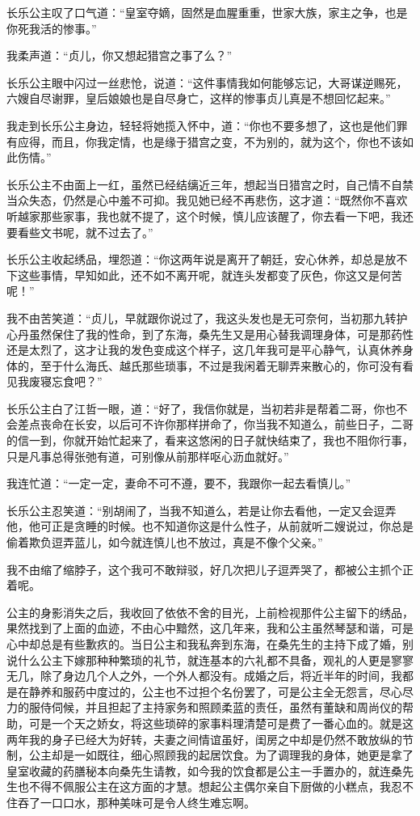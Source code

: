 长乐公主叹了口气道：“皇室夺嫡，固然是血腥重重，世家大族，家主之争，也是你死我活的惨事。”

我柔声道：“贞儿，你又想起猎宫之事了么？”

长乐公主眼中闪过一丝悲怆，说道：“这件事情我如何能够忘记，大哥谋逆赐死，六嫂自尽谢罪，皇后娘娘也是自尽身亡，这样的惨事贞儿真是不想回忆起来。”

我走到长乐公主身边，轻轻将她揽入怀中，道：“你也不要多想了，这也是他们罪有应得，而且，你我定情，也是缘于猎宫之变，不为别的，就为这个，你也不该如此伤情。”

长乐公主不由面上一红，虽然已经结缡近三年，想起当日猎宫之时，自己情不自禁当众失态，仍然是心中羞不可抑。我见她已经不再悲伤，这才道：“既然你不喜欢听越家那些家事，我也就不提了，这个时候，慎儿应该醒了，你去看一下吧，我还要看些文书呢，就不过去了。”

长乐公主收起绣品，埋怨道：“你这两年说是离开了朝廷，安心休养，却总是放不下这些事情，早知如此，还不如不离开呢，就连头发都变了灰色，你这又是何苦呢！”

我不由苦笑道：“贞儿，早就跟你说过了，我这头发也是无可奈何，当初那九转护心丹虽然保住了我的性命，到了东海，桑先生又是用心替我调理身体，可是那药性还是太烈了，这才让我的发色变成这个样子，这几年我可是平心静气，认真休养身体的，至于什么海氏、越氏那些琐事，不过是我闲着无聊弄来散心的，你可没有看见我废寝忘食吧？”

长乐公主白了江哲一眼，道：“好了，我信你就是，当初若非是帮着二哥，你也不会差点丧命在长安，以后可不许你那样拼命了，你当我不知道么，前些日子，二哥的信一到，你就开始忙起来了，看来这悠闲的日子就快结束了，我也不阻你行事，只是凡事总得张弛有道，可别像从前那样呕心沥血就好。”

我连忙道：“一定一定，妻命不可不遵，要不，我跟你一起去看慎儿。”

长乐公主忍笑道：“别胡闹了，当我不知道么，若是让你去看他，一定又会逗弄他，他可正是贪睡的时候。也不知道你这是什么性子，从前就听二嫂说过，你总是偷着欺负逗弄蓝儿，如今就连慎儿也不放过，真是不像个父亲。”

我不由缩了缩脖子，这个我可不敢辩驳，好几次把儿子逗弄哭了，都被公主抓个正着呢。

公主的身影消失之后，我收回了依依不舍的目光，上前检视那件公主留下的绣品，果然找到了上面的血迹，不由心中黯然，这几年来，我和公主虽然琴瑟和谐，可是心中却总是有些歉疚的。当日公主和我私奔到东海，在桑先生的主持下成了婚，别说什么公主下嫁那种种繁琐的礼节，就连基本的六礼都不具备，观礼的人更是寥寥无几，除了身边几个人之外，一个外人都没有。成婚之后，将近半年的时间，我都是在静养和服药中度过的，公主也不过担个名份罢了，可是公主全无怨言，尽心尽力的服侍伺候，并且担起了主持家务和照顾柔蓝的责任，虽然有董缺和周尚仪的帮助，可是一个天之娇女，将这些琐碎的家事料理清楚可是费了一番心血的。就是这两年我的身子已经大为好转，夫妻之间情谊虽好，闺房之中却是仍然不敢放纵的节制，公主却是一如既往，细心照顾我的起居饮食。为了调理我的身体，她更是拿了皇室收藏的药膳秘本向桑先生请教，如今我的饮食都是公主一手置办的，就连桑先生也不得不佩服公主在这方面的才慧。想起公主偶尔亲自下厨做的小糕点，我忍不住吞了一口口水，那种美味可是令人终生难忘啊。

